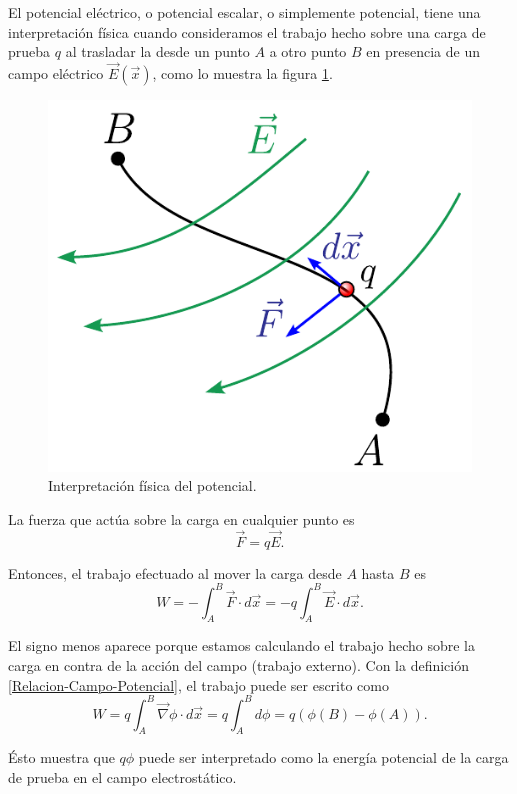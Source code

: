 El potencial eléctrico, o potencial escalar, o simplemente potencial, tiene una interpretación física cuando consideramos el trabajo hecho sobre una carga de prueba $q$ al trasladar la desde un punto $A$ a otro punto $B$ en presencia de un campo eléctrico $\vec{E}(\vec{x})$, como lo muestra la  figura \ref{fig:Significado-Potencial}.

\begin{figure}[H]
    \centering
    \includegraphics[scale = 0.65]{Figuras/Significado-Potencial.pdf}
    \caption{Interpretación física del potencial.}
    \label{fig:Significado-Potencial}
\end{figure}

La fuerza que actúa sobre la carga en cualquier punto es
$$\vec{F} = q \vec{E}.$$

Entonces, el trabajo efectuado al mover la carga desde $A$ hasta $B$ es 
$$W = - \int_A^B \vec{F} \cdot d\vec{x} = -q \int_A^B \vec{E} \cdot d\vec{x}.$$

El signo menos aparece porque estamos calculando el trabajo hecho sobre la carga  en contra de la acción del campo (trabajo externo). Con la definición \eqref{Relacion-Campo-Potencial}, el trabajo puede ser escrito como
$$W = q \int_A^B \vec{\nabla} \phi \cdot d\vec{x} = q \int_A^B d\phi = q (\phi(B) - \phi(A)).$$

Ésto muestra que $q\phi$ puede ser interpretado como la energía potencial de la carga de prueba en el campo electrostático. 

